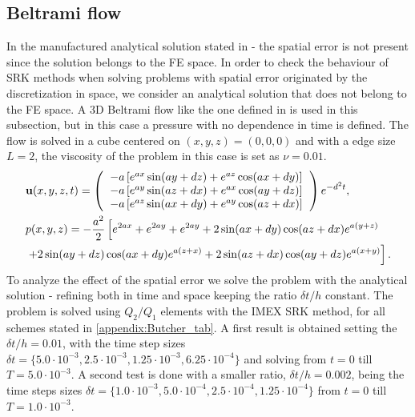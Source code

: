 \subsection{Beltrami flow}
In the manufactured analytical solution stated in - the spatial error is not present since the solution belongs to the FE space. In order to check the behaviour of SRK methods when solving problems with spatial error originated by the discretization in space, we consider an analytical solution that does not belong to the FE space. A 3D Beltrami flow like the one defined in \cite{ethier_exact_1994} is used in this subsection, but in this case a pressure with no dependence in time is defined. The flow is solved in a cube centered on $(x,y,z)=(0,0,0)$ and with a edge size $L=2$, the viscosity of the problem in this case is set as $\nu=0.01$.
\begin{align}
\label{eq-C6_beltrami_u}
&\u(x,y,z,t) = \left( \begin{tabular}{l}
$-a\left[e^{ax}\sin(ay+dz)+e^{az}\cos(ax+dy)\right]$\\
$-a\left[e^{ay}\sin(az+dx)+e^{ax}\cos(ay+dz)\right]$\\
$-a\left[e^{az}\sin(ax+dy)+e^{ay}\cos(az+dx)\right]$
\end{tabular}\right)e^{-d^2t},\\
\label{eq-C6_beltrami_p}
&p(x,y,z) = -\frac{a^2}{2}\left[e^{2ax}+e^{2ay}+e^{2ay}+2\sin(ax+dy)\cos(az+dx)e^{a(y+z)}\right. \\\nonumber
&\left.+2\sin(ay+dz)\cos(ax+dy)e^{a(z+x)}+2\sin(az+dx)\cos(ay+dz)e^{a(x+y)}\right].
\end{align}
To analyze the effect of the spatial error we solve the problem with the analytical solution - refining both in time and space keeping the ratio $\delta t/h$ constant. The problem is solved using $Q_2/Q_1$ elements with the IMEX SRK method, for all schemes stated in \ref{appendix:Butcher_tab}. A first result is obtained setting the $\delta t/h=0.01$, with the time step sizes $\delta t=\{5.0\cdot10^{-3},2.5\cdot10^{-3},1.25\cdot10^{-3},6.25\cdot10^{-4}\}$ and solving from $t=0$ till $T=5.0\cdot10^{-3}$. A second test is done with a smaller ratio, $\delta t/h=0.002$, being the time steps sizes $\delta t=\{1.0\cdot10^{-3},5.0\cdot10^{-4},2.5\cdot10^{-4},1.25\cdot10^{-4}\}$ from $t=0$ till $T=1.0\cdot10^{-3}$.
